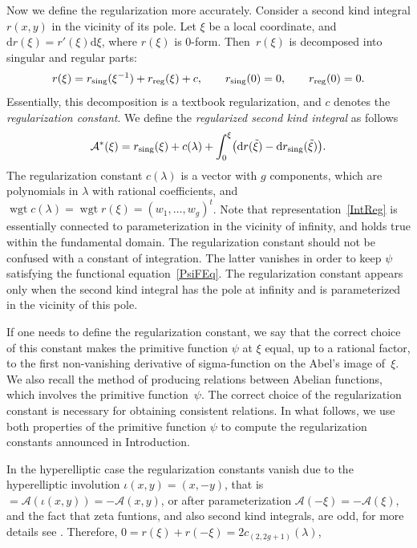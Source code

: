 \documentclass[11pt]{article}
\numberwithin{equation}{section}
\DeclareMathOperator{\wgt}{wgt}
\newcommand{\rmd}{\mathrm{d}}
\begin{document}
Now we define the regularization more accurately. Consider a second kind integral $r(x,y)$ in the vicinity of its pole. Let $\xi$ be a local coordinate, and $\rmd r(\xi)=r'(\xi)\rmd \xi$, where $r(\xi)$ is $0$-form. Then~$r(\xi)$ is decomposed into singular and regular parts:
\begin{gather*}%
 r(\xi) = r_{\textup{sing}}(\xi^{-1}) + r_{\textup{reg}}(\xi) + c,\qquad r_{\textup{sing}}(0)=0,\qquad r_{\textup{reg}}(0)=0.
\end{gather*}
Essentially, this decomposition is a textbook regularization, and $c$ denotes the \emph{regularization constant}. We define the \emph{regularized second kind integral} as follows
\begin{gather}\label{IntReg}
 \mathcal{A}^\ast(\xi)= r_{\textup{sing}} (\xi)
+ c(\lambda) + \int_0^{\xi} \bigl(\rmd r(\tilde{\xi})- \rmd r_{\textup{sing}} (\tilde{\xi}) \bigr).
\end{gather}
The regularization constant $c(\lambda)$ {is a vector with $g$ components, which are} polynomials in $\lambda$ with rational coefficients, and $\wgt c(\lambda) = \wgt r(\xi) = (w_1,\dots,w_g)^t$. Note that representation~\eqref{IntReg} is essentially connected to parameterization in the vicinity of infinity, and holds true within the fundamental domain. The regularization constant should not be confused with a constant of integration. The latter vanishes in order to keep $\psi$ satisfying the functional equation~\eqref{PsiFEq}. The regularization constant appears only when the second kind integral has the pole at infinity and is parameterized in the vicinity of this pole.

If one needs to define the regularization constant, we say that the correct choice of this constant makes the primitive function $\psi$ at $\xi$ equal, up to a rational factor, to the first non-vanishing derivative of sigma-function on the Abel's image of~$\xi$. We also recall {the method} of producing relations between Abelian functions, which involves the primitive function~$\psi$. The correct choice of the regularization constant is necessary for obtaining consistent relations. In what follows, we use both properties of the primitive function $\psi$ to compute the regularization constants announced in Introduction.

In the hyperelliptic case the regularization constants vanish due to the hyperelliptic involution $\iota(x,y) = (x,-y)$, that is $ = \mathcal{A}(\iota(x,y)) = -\mathcal{A}(x,y)$, or after parameterization $\mathcal{A}(-\xi) = -\mathcal{A}(\xi)$, and the fact that zeta funtions, and also second kind integrals, are odd, for more details see \cite[Section~193]{BakerAF}. Therefore, $0=r(\xi)+r(-\xi)=2c_{(2,2g+1)}(\lambda)$,
\end{document}
